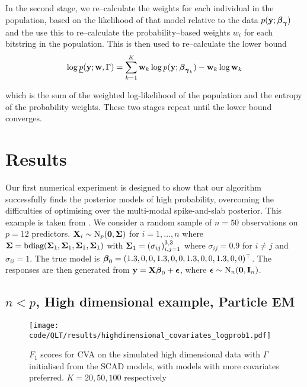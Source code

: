 \documentclass{amsart}[12pt]
\begin{document}
In the second stage, we re--calculate the weights for each individual in the population, based on the
likelihood of that model relative to the data $p({\bf y}; {\boldsymbol \beta}_{\boldsymbol \gamma})$ and the use this to re--calculate the
probability--based weights $w_i$ for each bitstring in the population. This is then used to re--calculate the
lower bound
\[
	\log \underline{p}({\bf y}; {\bf w}, \Gamma) = \sum_{k=1}^K {\bf w}_k \log p({\bf y}; {\boldsymbol \beta}_{{\boldsymbol \gamma}_k}) - {\bf w}_k \log {\bf w}_k
\]

which is the sum of the weighted log-likelihood of the population and the entropy of the probability weights.
These two stages repeat until the lower bound converges.

\section{Results}


Our first numerical experiment is designed to show that our algorithm successfully finds the posterior models
of high probability, overcoming the difficulties of optimising over the multi-modal spike-and-slab posterior.
This example is taken from \citep{Rockova2016}. 
We consider a random sample of $n = 50$ observations on $p = 12$ predictors. ${\bf X}_i \sim \text{N}_p({\bf 0}, {\boldsymbol \Sigma})$
for $i = 1, \ldots, n$ where
${\boldsymbol \Sigma} = \text{bdiag}({\boldsymbol \Sigma}_1, {\boldsymbol \Sigma}_1, {\boldsymbol \Sigma}_1, {\boldsymbol \Sigma}_1)$ with
${\boldsymbol \Sigma}_1 = (\sigma_{ij})_{i, j = 1}^{3, 3}$ where $\sigma_{ij} = 0.9$ for $i \ne j$ and $\sigma_{ii} = 1$.
The true model is ${\boldsymbol \beta}_0 = (1.3, 0, 0, 1.3, 0, 0, 1.3, 0, 0, 1.3, 0, 0)^\top$.
The responses are then generated from ${\bf y} = {\bf X} {\boldsymbol \beta}_0 + {\boldsymbol \epsilon}$, where
${\boldsymbol \epsilon} \sim \text{N}_n({\bf 0}, {\bf I}_n)$.

\subsection{$n < p$, High dimensional example, Particle EM}

\begin{figure}\label{fig:highdim_warm_start_covariates}
\caption{$F_1$ scores for CVA on the simulated high dimensional data with $\Gamma$ initialised from the SCAD models, with models with more covariates preferred. $K=20, 50, 100$ respectively}
\texttt{[image: code/QLT/results/highdimensional\_covariates\_logprob1.pdf]}
\end{figure}
\end{document}
